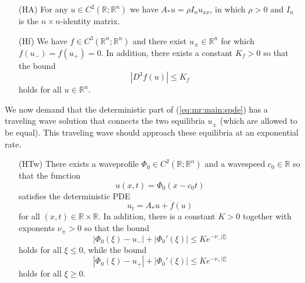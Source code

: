 \documentclass[10pt]{articleHJ}
\newcommand{\Real}{\mathbb{R}}							%
\newcommand{\abs}[1]{\left\vert#1\right\vert}			%
\newcommand{\sref}[1]{(\ref{#1})}                       %
\numberwithin{equation}{section}
\begin{document}
\begin{itemize}
\item[(HA)]{
  For any $u \in C^2(\Real; \Real^n)$ we have
  $A_* u = \rho I_n u_{xx}$,
  in which $\rho >0$ and $I_n$ is the $n \times n$-identity matrix.
}
\item[(Hf)]{
 We have $f \in C^3(\Real^n; \Real^n)$
 and there exist $u_\pm \in \Real^n$
 for which $f(u_-) = f(u_+) = 0 $.
 In addition, there exists a constant $K_f > 0$
 so that the bound
 \begin{equation}
   \abs{ D^3 f(u) } \le K_f
 \end{equation}
 holds for all $u \in \Real^n$.
}
\end{itemize}

We now demand that the deterministic part
of \sref{eq:mr:main:spde}
has a traveling wave solution
that connects the two equilibria $u_\pm$
(which are allowed to be equal). This traveling
wave should approach these equilibria at an exponential rate.






\begin{itemize}
\item[(HTw)]{
  There exists a waveprofile $\Phi_{0} \in C^2(\Real ; \Real^n)$
  and a wavespeed $c_0 \in \Real$
  so that the function
  \begin{equation}
  \label{eq:mr:trv:wave:ansatz}
  u(x, t) = \Phi_{0}(x - c_0 t)
  \end{equation}
  satisfies the deterministic PDE
  \begin{equation}
    \label{eq:mr:det:pde}
    u_t = A_* u + f(u)
  \end{equation}
  for all $(x,t) \in \Real \times \Real$.
%
  In addition, there is a constant $K > 0$ together with
  exponents $\nu_\pm>0 $ so that the bound
  \begin{equation}
    \label{eq:mr:exp:apr:left}
    \abs{\Phi_0(\xi) - u_- } + \abs{\Phi_0'(\xi)} \le K e^{-\nu_- \abs{\xi} }
  \end{equation}
  holds for all $\xi \le 0$, while the bound
  \begin{equation}
    \label{eq:mr:exp:apr:right}
    \abs{\Phi_0(\xi) - u_+ } + \abs{\Phi_0'(\xi)}
      \le K e^{-\nu_+ \abs{\xi} }
  \end{equation}
  holds for all $\xi \ge 0$.
}
\end{itemize}
\end{document}
